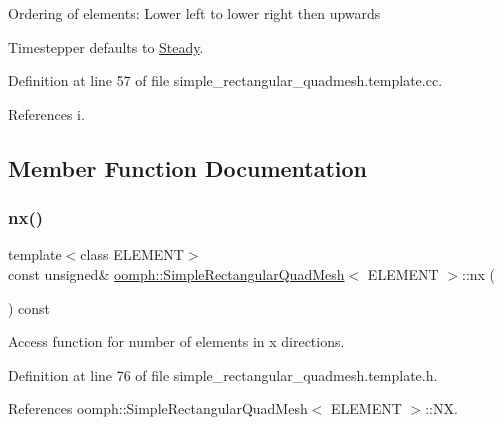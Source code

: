 Ordering of elements\+: \textquotesingle{}Lower left\textquotesingle{} to \textquotesingle{}lower right\textquotesingle{} then \textquotesingle{}upwards\textquotesingle{}

Timestepper defaults to \hyperlink{classoomph_1_1Steady}{Steady}. 

Definition at line 57 of file simple\+\_\+rectangular\+\_\+quadmesh.\+template.\+cc.



References i.



\subsection{Member Function Documentation}
\mbox{\label{classoomph_1_1SimpleRectangularQuadMesh_a4ff7678ec433180e2245ea2147f222b7}} 
\subsubsection{\texorpdfstring{nx()}{nx()}}
{\footnotesize\ttfamily template$<$class E\+L\+E\+M\+E\+NT$>$ \\
const unsigned\& \hyperlink{classoomph_1_1SimpleRectangularQuadMesh}{oomph\+::\+Simple\+Rectangular\+Quad\+Mesh}$<$ E\+L\+E\+M\+E\+NT $>$\+::nx (\begin{DoxyParamCaption}{ }\end{DoxyParamCaption}) const\hspace{0.3cm}{\ttfamily [inline]}}



Access function for number of elements in x directions. 



Definition at line 76 of file simple\+\_\+rectangular\+\_\+quadmesh.\+template.\+h.



References oomph\+::\+Simple\+Rectangular\+Quad\+Mesh$<$ E\+L\+E\+M\+E\+N\+T $>$\+::\+NX.

\mbox{\label{classoomph_1_1SimpleRectangularQuadMesh_a45011f22dedd480392b1f376e4269921}} 
